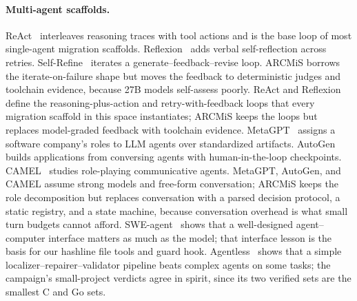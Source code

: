 \documentclass[11pt]{article}
\begin{document}
\paragraph{Multi-agent scaffolds.}
ReAct~\cite{yao2023react} interleaves reasoning traces with tool actions
and is the base loop of most single-agent migration scaffolds.
Reflexion~\cite{shinn2023reflexion}
adds verbal self-reflection across retries. Self-Refine~\cite{madaan2023selfrefine}
iterates a generate--feedback--revise loop. ARCMiS borrows the
iterate-on-failure shape but moves the feedback to deterministic judges
and toolchain evidence, because 27B models self-assess poorly. ReAct and
Reflexion define the reasoning-plus-action and
retry-with-feedback loops that every migration scaffold in this space
instantiates; ARCMiS keeps the loops but replaces model-graded feedback
with toolchain evidence. MetaGPT~\cite{hong2024metagpt} assigns a software company's
roles to LLM agents over standardized artifacts. AutoGen~\cite{wu2023autogen}
builds applications from conversing agents with human-in-the-loop
checkpoints. CAMEL~\cite{li2023camel} studies role-playing communicative
agents. MetaGPT, AutoGen, and CAMEL assume strong models and free-form
conversation; ARCMiS keeps the role decomposition but replaces
conversation with a parsed decision protocol, a static registry, and a
state machine, because conversation overhead is what small turn budgets
cannot afford. SWE-agent~\cite{yang2024sweagent} shows that a
well-designed agent--computer interface matters as much as the model;
that interface lesson is the basis for our hashline file tools and guard
hook. Agentless~\cite{xia2025agentless}
shows that a simple localizer--repairer--validator pipeline beats complex
agents on some tasks; the campaign's small-project verdicts agree in
spirit, since its two verified sets are the smallest C and Go sets.
\end{document}
